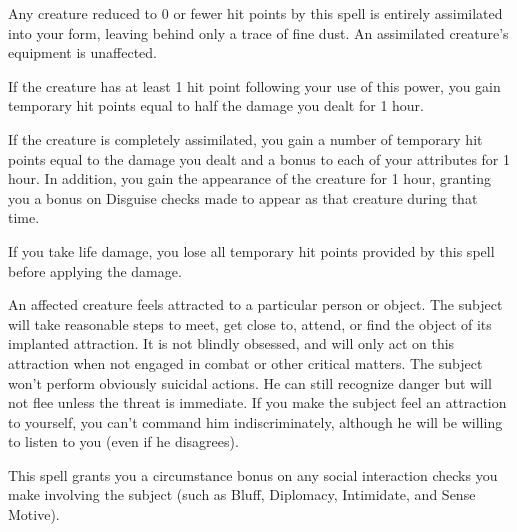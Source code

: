 \spellrng{\rngtouch}
\par Any creature reduced to 0 or fewer hit points by this spell is entirely assimilated into your form, leaving behind only a trace of fine dust. An assimilated creature's equipment is unaffected.
\par If the creature has at least 1 hit point following your use of this power, you gain temporary hit points equal to half the damage you dealt for 1 hour.
\par If the creature is completely assimilated, you gain a number of temporary hit points equal to the damage you dealt and a  bonus to each of your attributes for 1 hour. In addition, you gain the appearance of the creature for 1 hour, granting you a  bonus on Disguise checks made to appear as that creature during that time.

If you take life damage, you lose all temporary hit points provided by this spell before applying the damage.

\spellrng{\rngmed}
\spelldur{\durext}
\begin{spelleffect}
  An affected creature feels attracted to a particular person or object. The subject will take reasonable steps to meet, get close to, attend, or find the object of its implanted attraction. It is not blindly obsessed, and will only act on this attraction when not engaged in combat or other critical matters. The subject won't perform obviously suicidal actions. He can still recognize danger but will not flee unless the threat is immediate. If you make the subject feel an attraction to yourself, you can't command him indiscriminately, although he will be willing to listen to you (even if he disagrees).
  \par This spell grants you a  circumstance bonus on any social interaction checks you make involving the subject (such as Bluff, Diplomacy, Intimidate, and Sense Motive).
\end{spelleffect}

